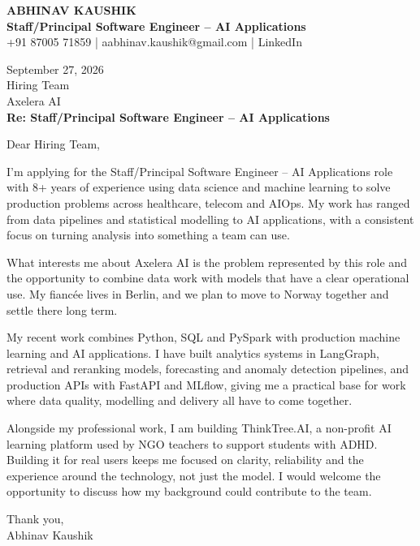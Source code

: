 \documentclass[10pt,a4paper]{article}
\begin{document}
\begin{center}
{\Large\bfseries ABHINAV KAUSHIK}\\[2pt]
{\bfseries Staff/Principal Software Engineer – AI Applications}\\[2pt]
+91 87005 71859 \quad | \quad aabhinav.kaushik@gmail.com \quad | \quad LinkedIn
\end{center}
\vspace{8pt}
September 27, 2026\\[6pt]
Hiring Team\\
Axelera AI\\[4pt]
\textbf{Re: Staff/Principal Software Engineer – AI Applications}

Dear Hiring Team,

I’m applying for the Staff/Principal Software Engineer – AI Applications role with 8+ years of experience using data science and machine learning to solve production problems across healthcare, telecom and AIOps. My work has ranged from data pipelines and statistical modelling to AI applications, with a consistent focus on turning analysis into something a team can use.

What interests me about Axelera AI is the problem represented by this role and the opportunity to combine data work with models that have a clear operational use. My fiancée lives in Berlin, and we plan to move to Norway together and settle there long term.

My recent work combines Python, SQL and PySpark with production machine learning and AI applications. I have built analytics systems in LangGraph, retrieval and reranking models, forecasting and anomaly detection pipelines, and production APIs with FastAPI and MLflow, giving me a practical base for work where data quality, modelling and delivery all have to come together.

Alongside my professional work, I am building ThinkTree.AI, a non-profit AI learning platform used by NGO teachers to support students with ADHD. Building it for real users keeps me focused on clarity, reliability and the experience around the technology, not just the model. I would welcome the opportunity to discuss how my background could contribute to the team.

Thank you,\\
Abhinav Kaushik
\end{document}
